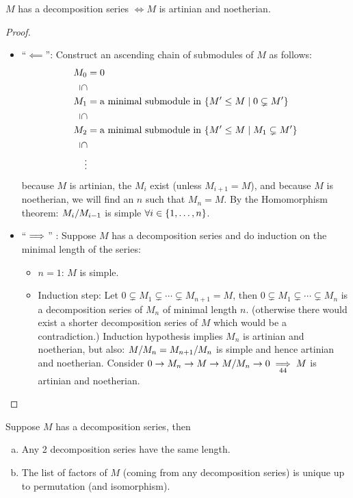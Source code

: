 \documentclass[a4paper]{report}
\begin{document}
\begin{prop}
$M$ has a decomposition series $\iff M$ is artinian and noetherian.
\begin{proof}
\begin{itemize}
  \item ``$\impliedby$'': Construct an ascending chain of submodules of $M$ as follows:
        \begin{align*}
          M_{0} &= 0 \\
          \rotatebox[origin=c]{270}{$\subseteq$}&\  \\
          M_{1} &= \text{a minimal submodule in } \{M' \le M \mid 0 \subsetneq M'\} \\
          \rotatebox[origin=c]{270}{$\subseteq$}&\  \\
          M_{2} &= \text{a minimal submodule in } \{M' \le M \mid M_{1} \subsetneq M'\} \\
          \rotatebox[origin=c]{270}{$\subseteq$}&\  \\
          \vdots  \\
        \end{align*}
        because $M$ is artinian, the $M_{i}$ exist (unless $M_{i+1} = M$), and because $M$ is noetherian, we will find an $n$ such that $M_{n} = M$. By the Homomorphism theorem: $\fak {M_{i}}{M_{i-1}}$ is simple $\forall i \in \{1, \ldots, n\}$.
  \item ``$\implies$'' : Suppose $M$ has a decomposition series and do induction on the minimal length of the series:
        \begin{itemize}
          \item $n = 1$: $M$ is simple.
                \item Induction step: Let $0 \subsetneq M_{1} \subsetneq \cdots \subsetneq M_{n+1} = M$, then $0 \subsetneq M_{1} \subsetneq \cdots \subsetneq M_{n}$ is a decomposition series of $M_{n}$ of minimal length $n$. (otherwise there would exist a shorter decomposition series of $M$ which would be a contradiction.) Induction hypothesis implies $M_{n}$ is artinian and noetherian, but also: $\fak M{M_{n}} = \fak {M_{n+1}}{M_{n}}$ is simple and hence artinian and noetherian. Consider $0 \to M_{n} \to M \to \fak M{M_{n}} \to 0 \underset{44}\imp M$ is artinian and noetherian. \qedhere
        \end{itemize}
\end{itemize}
\end{proof}
\end{prop}

\begin{thm}
  Suppose $M$ has a decomposition series, then
  \begin{enumerate}[(a)]
    \item Any 2 decomposition series have the same length.
          \item The list of factors of $M$ (coming from any decomposition series) is unique up to  permutation (and isomorphism).
  \end{enumerate}
\end{thm}
\end{document}
